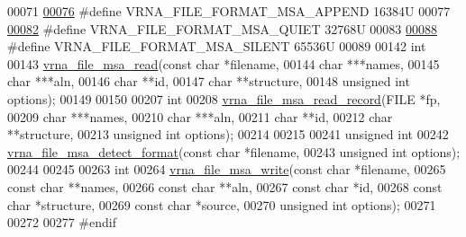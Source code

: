 \begin{DoxyCode}
00071 
\hyperlink{group__file__utils_ga1577ea0f497d9c501549c863a4f2c089}{00076} \textcolor{preprocessor}{#define VRNA\_FILE\_FORMAT\_MSA\_APPEND       16384U}
00077 
\hyperlink{group__file__utils_ga73aa3701a22c5acfcb2e8927287a0554}{00082} \textcolor{preprocessor}{#define VRNA\_FILE\_FORMAT\_MSA\_QUIET        32768U}
00083 
\hyperlink{group__file__utils_gad98ca08968d19f221f29d2a1faf26887}{00088} \textcolor{preprocessor}{#define VRNA\_FILE\_FORMAT\_MSA\_SILENT       65536U}
00089 
00142 \textcolor{keywordtype}{int}
00143 \hyperlink{group__file__utils_ga08a01c40ac5f5e0e04e9ae2258c99aa6}{vrna\_file\_msa\_read}(\textcolor{keyword}{const} \textcolor{keywordtype}{char}   *filename,
00144                    \textcolor{keywordtype}{char}         ***names,
00145                    \textcolor{keywordtype}{char}         ***aln,
00146                    \textcolor{keywordtype}{char}         **\textcolor{keywordtype}{id},
00147                    \textcolor{keywordtype}{char}         **structure,
00148                    \textcolor{keywordtype}{unsigned} \textcolor{keywordtype}{int} options);
00149 
00150 
00207 \textcolor{keywordtype}{int}
00208 \hyperlink{group__file__utils_ga59204cd1daa4927f5127cc65a2886efd}{vrna\_file\_msa\_read\_record}(FILE          *fp,
00209                           \textcolor{keywordtype}{char}          ***names,
00210                           \textcolor{keywordtype}{char}          ***aln,
00211                           \textcolor{keywordtype}{char}          **\textcolor{keywordtype}{id},
00212                           \textcolor{keywordtype}{char}          **structure,
00213                           \textcolor{keywordtype}{unsigned} \textcolor{keywordtype}{int}  options);
00214 
00215 
00241 \textcolor{keywordtype}{unsigned} \textcolor{keywordtype}{int}
00242 \hyperlink{group__file__utils_ga627ac281b5f11c63861726e6472626c9}{vrna\_file\_msa\_detect\_format}(\textcolor{keyword}{const} \textcolor{keywordtype}{char}    *filename,
00243                             \textcolor{keywordtype}{unsigned} \textcolor{keywordtype}{int}  options);
00244 
00245 
00263 \textcolor{keywordtype}{int}
00264 \hyperlink{group__file__utils_ga0c90faf1515ce0b16620036b1055ff1e}{vrna\_file\_msa\_write}(\textcolor{keyword}{const} \textcolor{keywordtype}{char}    *filename,
00265                     \textcolor{keyword}{const} \textcolor{keywordtype}{char}    **names,
00266                     \textcolor{keyword}{const} \textcolor{keywordtype}{char}    **aln,
00267                     \textcolor{keyword}{const} \textcolor{keywordtype}{char}    *\textcolor{keywordtype}{id},
00268                     \textcolor{keyword}{const} \textcolor{keywordtype}{char}    *structure,
00269                     \textcolor{keyword}{const} \textcolor{keywordtype}{char}    *source,
00270                     \textcolor{keywordtype}{unsigned} \textcolor{keywordtype}{int}  options);
00271 
00272 
00277 \textcolor{preprocessor}{#endif}
\end{DoxyCode}
